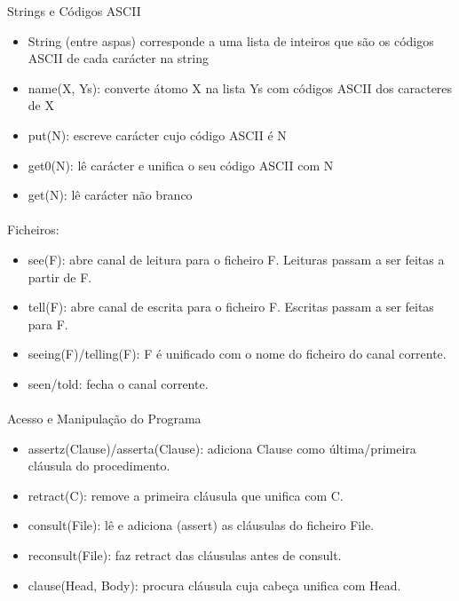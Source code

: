 \documentclass[../resumosPLOG.tex]{subfiles}
\begin{document}
Strings e Códigos ASCII
\begin{itemize}
    \item String (entre aspas) corresponde a uma lista de inteiros que são os códigos ASCII de cada carácter na string
    \item name(X, Ys): converte átomo X na lista Ys com códigos ASCII dos caracteres de X
    \item put(N): escreve carácter cujo código ASCII é N
    \item get0(N): lê carácter e unifica o seu código ASCII com N
    \item get(N): lê carácter não branco
\end{itemize}

\paragraph{}

Ficheiros:
\begin{itemize}
    \item see(F): abre canal de leitura para o ficheiro F. Leituras passam a ser feitas a partir de F.
    \item tell(F): abre canal de escrita para o ficheiro F. Escritas passam a ser feitas para F.
    \item seeing(F)/telling(F): F é unificado com o nome do ficheiro do canal corrente.
    \item seen/told: fecha o canal corrente.
\end{itemize}

\paragraph{}

Acesso e Manipulação do Programa
\begin{itemize}
    \item assertz(Clause)/asserta(Clause): adiciona Clause como última/primeira cláusula do procedimento.
    \item retract(C): remove a primeira cláusula que unifica com C.
    \item consult(File): lê e adiciona (assert) as cláusulas do ficheiro File.
    \item reconsult(File): faz retract das cláusulas antes de consult.
    \item clause(Head, Body): procura cláusula cuja cabeça unifica com Head.
\end{itemize}
\end{document}

